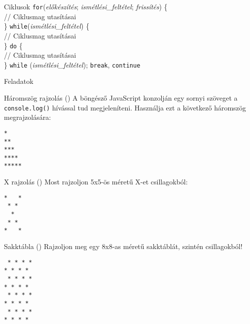 \documentclass[usenames,dvipsnames,aspectratio=169]{beamer}
\begin{document}
\begin{frame}
    Ciklusok
    \vfill
    \texttt{for}(\emph{előkészítés}; \emph{ismétlési\_feltétel}; \emph{frissítés}) \{ \\
    \qquad // Ciklusmag utasításai \\
    \}
    \vfill
    \texttt{while}(\emph{ismétlési\_feltétel}) \{ \\
    \qquad // Ciklusmag utasításai \\
    \}
    \vfill
    \texttt{do} \{ \\
    \qquad // Ciklusmag utasításai \\
    \} \texttt{while} (\emph{ismétlési\_feltétel});
    \vfill
    \texttt{break}, \texttt{continue}
\end{frame}

\begin{frame}[fragile]
    Feladatok
    \begin{exampleblock}{Háromszög rajzolás ()}
        A böngésző JavaScript konzolján egy sornyi szöveget a \texttt{console.log()} hívással tud megjeleníteni. Használja ezt a következő háromszög megrajzolására:\\
        \begin{verbatim}
*
**
***
****
*****                
\end{verbatim}
    \end{exampleblock}
\end{frame}

\begin{frame}[fragile]
    \begin{exampleblock}{X rajzolás ()}
        Most rajzoljon 5x5-ös méretű X-et csillagokból:\\
        \begin{verbatim}
*   *
 * *
  *
 * *
*   *            
\end{verbatim}
    \end{exampleblock}
\end{frame}

\begin{frame}[fragile]
    \begin{exampleblock}{Sakktábla ()}
        Rajzoljon meg egy 8x8-as méretű sakktáblát, szintén csillagokból!\\
        \begin{verbatim}
 * * * *
* * * *
 * * * *
* * * *
 * * * *
* * * *
 * * * *
* * * *
\end{verbatim}
    \end{exampleblock}
\end{frame}
\end{document}
